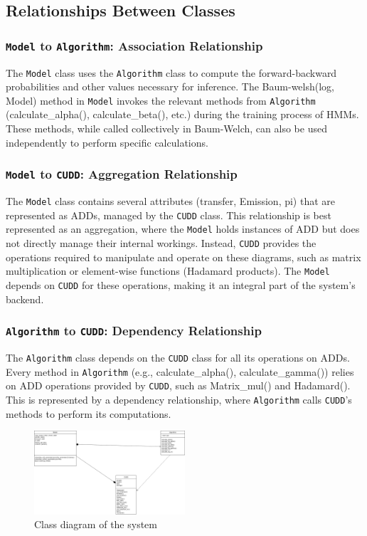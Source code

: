 \subsection{Relationships Between Classes}
\subsubsection{\texttt{Model} to \texttt{Algorithm}: Association Relationship}
The \texttt{Model} class uses the \texttt{Algorithm} class to compute the forward-backward probabilities and other values necessary for inference. 
The Baum-welsh(log, Model) method in \texttt{Model} invokes the relevant methods from \texttt{Algorithm} (calculate\_alpha(), calculate\_beta(), etc.) during the training process of HMMs. 
These methods, while called collectively in Baum-Welch, can also be used independently to perform specific calculations.

\subsubsection{\texttt{Model} to \texttt{CUDD}: Aggregation Relationship}
The \texttt{Model} class contains several attributes (transfer, Emission, pi) that are represented as ADDs, managed by the \texttt{CUDD} class.
This relationship is best represented as an aggregation, where the \texttt{Model} holds instances of ADD but does not directly manage their internal workings.
Instead, \texttt{CUDD} provides the operations required to manipulate and operate on these diagrams, such as matrix multiplication or element-wise functions (Hadamard products).
The \texttt{Model} depends on \texttt{CUDD} for these operations, making it an integral part of the system's backend.

\subsubsection{\texttt{Algorithm} to \texttt{CUDD}: Dependency Relationship}
The \texttt{Algorithm} class depends on the \texttt{CUDD} class for all its operations on ADDs.
Every method in \texttt{Algorithm} (e.g., calculate\_alpha(), calculate\_gamma()) relies on ADD operations provided by \texttt{CUDD}, such as Matrix\_mul() and Hadamard().
This is represented by a dependency relationship, where \texttt{Algorithm} calls \texttt{CUDD}'s methods to perform its computations.

\begin{figure}
    \centering
    \includegraphics[width=0.5\textwidth]{figures/class-diagram.png}
    \caption{Class diagram of the system}
    \label{fig:class-diagram}
\end{figure}
